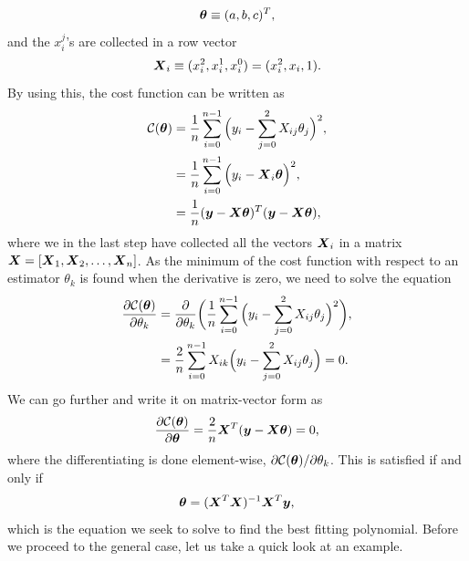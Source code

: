 \begin{equation}
\boldsymbol{{\theta}}\equiv(a,b,c)^T,
\end{equation}
and the $x_i^j$'s are collected in a row vector
\begin{equation}
\boldsymbol{{X}}_i\equiv(x_i^2, x_i^1, x_i^0)=(x_i^2, x_i, 1).
\end{equation}
By using this, the cost function can be written as
\begin{equation}
\begin{aligned}
\mathcal{C}(\boldsymbol{{\theta}})&=\frac{1}{n}\sum_{i=0}^{n-1}\Big(y_i-\sum_{j=0}^2X_{ij}\theta_j\Big)^2,\\
&=\frac{1}{n}\sum_{i=0}^{n-1}\Big(y_i-\boldsymbol{{X}}_i\boldsymbol{{\theta}}\Big)^2,\\
&=\frac{1}{n}(\boldsymbol{{y}}-\boldsymbol{{X}}\boldsymbol{{\theta}})^T(\boldsymbol{{y}}-\boldsymbol{{X}}\boldsymbol{{\theta}}),
\end{aligned}
\label{eq:polynomialcost}
\end{equation}
where we in the last step have collected all the vectors $\boldsymbol{{X}}_i$ in a matrix $\boldsymbol{{X}}=[\boldsymbol{{X}}_1,\boldsymbol{{X}}_2,\hdots,\boldsymbol{{X}}_n]$. As the minimum of the cost function with respect to an estimator $\theta_k$ is found when the derivative is zero, we need to solve the equation
\begin{equation}
\begin{aligned}
\frac{\partial \mathcal{C}(\boldsymbol{{\theta}})}{\partial\theta_k} &=\frac{\partial}{\partial\theta_k}\bigg(\frac{1}{n}\sum_{i=0}^{n-1}\Big(y_i-\sum_{j=0}^2X_{ij}\theta_j\Big)^2\bigg),\\
&=\frac{2}{n}\sum_{i=0}^{n-1}X_{ik}\Big(y_i-\sum_{j=0}^2X_{ij}\theta_j\Big)=0.
\end{aligned}
\end{equation}
We can go further and write it on matrix-vector form as
\begin{equation}
\frac{\partial \mathcal{C}(\boldsymbol{{\theta}})}{\partial\boldsymbol{{\theta}}}=\frac{2}{n}\boldsymbol{{X}}^T(\boldsymbol{{y}}-\boldsymbol{{X}}\boldsymbol{{\theta}})=0,
\end{equation}
where the differentiating is done element-wise, $\partial\mathcal{C(\boldsymbol{{\theta}})}/\partial\theta_k$. This is satisfied if and only if
\begin{equation}
\boldsymbol{{\theta}}=(\boldsymbol{{X}}^T\boldsymbol{{X}})^{-1}\boldsymbol{{X}}^T\boldsymbol{{y}},
\label{eq:polynomialestimators}
\end{equation}
which is the equation we seek to solve to find the best fitting polynomial. Before we proceed to the general case, let us take a quick look at an example.

